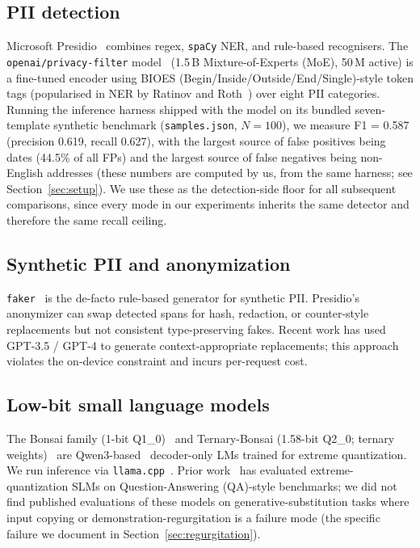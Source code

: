\documentclass[11pt]{article}
\newcommand{\code}[1]{\texttt{#1}}
\newcommand{\openaipf}{\code{openai/privacy-filter}}
\newcommand{\faker}{\code{faker}}
\newcommand{\spacy}{\code{spaCy}}
\begin{document}
\subsection{PII detection}
Microsoft Presidio~\cite{presidio} combines regex, \spacy{} NER, and
rule-based recognisers. The \openaipf{} model~\cite{privacyfilter}
(1.5\,B Mixture-of-Experts (MoE), 50\,M active) is a fine-tuned encoder
using BIOES (Begin/Inside/Outside/End/Single)-style token tags
(popularised in NER by Ratinov and Roth~\cite{ratinov2009bioes}) over
eight PII categories. Running the
inference harness shipped with the model on its bundled
seven-template synthetic benchmark
(\code{samples.json}, $N{=}100$), we measure F1 = 0.587 (precision
0.619, recall 0.627), with the largest source of false positives being
dates (44.5\% of all FPs) and the largest source of false negatives
being non-English addresses (these numbers are computed by us, from
the same harness; see Section~\ref{sec:setup}). We use these as the
detection-side floor for all subsequent comparisons, since every mode
in our experiments inherits the same detector and therefore the same
recall ceiling.

\subsection{Synthetic PII and anonymization}
\faker{}~\cite{faker} is the de-facto rule-based generator for
synthetic PII. Presidio's anonymizer can swap detected spans for hash,
redaction, or counter-style replacements but not consistent
type-preserving fakes. Recent work has used GPT-3.5 / GPT-4
\cite{gpt4tr} to generate context-appropriate replacements; this
approach violates the on-device constraint and incurs per-request cost.

\subsection{Low-bit small language models}
The Bonsai family (1-bit Q1\_0)~\cite{bonsai} and Ternary-Bonsai
(1.58-bit Q2\_0; ternary weights)~\cite{ternarybonsai} are
Qwen3-based~\cite{qwen3} decoder-only LMs trained for extreme
quantization. We run inference via
\code{llama.cpp}~\cite{llamacpp}. Prior work~\cite{bitnet} has
evaluated extreme-quantization SLMs on Question-Answering (QA)-style
benchmarks; we did not find published evaluations of these models on
generative-substitution tasks where input copying or
demonstration-regurgitation is a failure mode (the specific failure
we document in Section~\ref{sec:regurgitation}).
\end{document}
